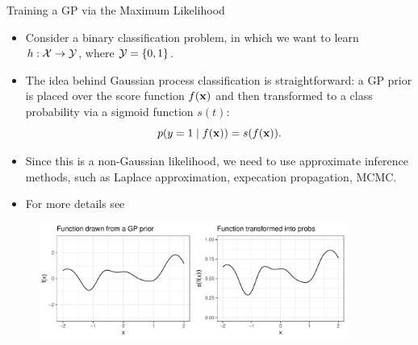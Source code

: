 \begin{frame}[c,allowframebreaks]{Training a GP via the Maximum Likelihood}

\begin{itemize}
\item Consider a binary classification problem, in which we want to learn $h: \mathcal{X} \to \mathcal{Y}$, where $\mathcal{Y} = \{0, 1\}$. 

\lz
\item The idea behind Gaussian process classification is straightforward: a GP prior is placed over the score function $f(\mathbf{x})$ and then transformed to a class probability via a sigmoid function $s(t)$:
\vspace{-3mm}
$$p(y = 1 \mid f(\mathbf{x}) ) = s(f(\mathbf{x})).$$

\vspace{3mm}
\item Since this is a non-Gaussian likelihood, we need to use approximate inference methods, such as Laplace approximation, expecation propagation, MCMC.

\lz
\item For more details see  
\end{itemize}


\framebreak


\begin{figure}
\includegraphics[width=0.9\textwidth]{figure_man/gp-classif-1-1.pdf}
\end{figure}



\framebreak


\begin{itemize}


\end{itemize}
\end{frame}
